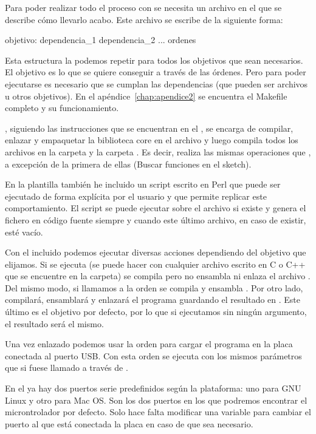Para poder realizar todo el proceso con  se necesita un archivo  en el que se describe cómo llevarlo acabo. Este archivo se escribe de la siguiente forma:
\begin{listing}[language=make]
objetivo: dependencia_1 dependencia_2 ...
	ordenes
\end{listing}
Esta estructura la podemos repetir para todos los objetivos que sean necesarios. El objetivo es lo que se quiere conseguir a través de las órdenes. Pero para poder ejecutarse es necesario que se cumplan las dependencias (que pueden ser archivos u otros objetivos). En el apéndice~\ref{chap:apendice2} se encuentra el Makefile completo y su funcionamiento.

, siguiendo las instrucciones que se encuentran en el , se encarga de compilar, enlazar y empaquetar la biblioteca core en el archivo  y luego compila todos los archivos en la carpeta  y la carpeta . Es decir, realiza las mismas operaciones que , a excepción de la primera de ellas (Buscar funciones en el sketch).

En la plantilla también he incluido un script escrito en Perl que puede ser ejecutado de forma explícita por el usuario y que permite replicar este comportamiento. El script se puede ejecutar sobre el archivo  si existe y genera el fichero en código fuente  siempre y cuando este último archivo, en caso de existir, esté vacío.

Con el  incluido podemos ejecutar diversas acciones dependiendo del objetivo que elijamos. Si se ejecuta  (se puede hacer con cualquier archivo escrito en C o C++ que se encuentre en la carpeta) se compila pero no ensambla ni enlaza el archivo . Del mismo modo, si llamamos a la orden  se compila y ensambla . Por otro lado,  compilará, ensamblará y enlazará el programa guardando el resultado en . Este último es el objetivo por defecto, por lo que si ejecutamos  sin ningún argumento, el resultado será el mismo.

Una vez enlazado podemos usar la orden  para cargar el programa en la placa conectada al puerto USB\@. Con esta orden se ejecuta  con los mismos parámetros que si fuese llamado a través de .

En el  ya hay dos puertos serie predefinidos según la plataforma: uno para GNU Linux y otro para Mac OS. Son los dos puertos en los que podremos encontrar el microntrolador por defecto. Solo hace falta modificar una variable para cambiar el puerto al que está conectada la placa en caso de que sea necesario.
